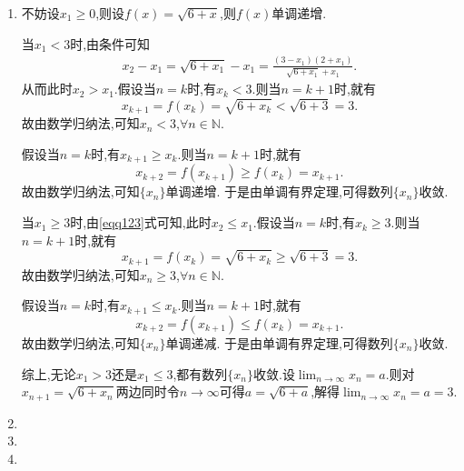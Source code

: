 \documentclass[../../main.tex]{subfiles}%
\begin{document}
\begin{solution}
\begin{enumerate}
\item 不妨设$x_1\geqslant  0$,则设\(f(x)=\sqrt{6 + x}\),则\(f(x)\)单调递增.

当\(x_1 < 3\)时,由条件可知
\begin{gather}\label{eqq123}
x_2 - x_1=\sqrt{6 + x_1}-x_1=\frac{(3 - x_1)(2 + x_1)}{\sqrt{6 + x_1}+x_1}.
\end{gather}
从而此时\(x_2 > x_1\).假设当\(n = k\)时,有\(x_k < 3\).则当\(n = k + 1\)时,就有
\[
x_{k + 1}=f(x_k)=\sqrt{6 + x_k}<\sqrt{6 + 3}=3.
\]
故由数学归纳法,可知\(x_n < 3\),\(\forall n\in\mathbb{N}\).

假设当\(n = k\)时,有\(x_{k + 1}\geqslant x_k\).则当\(n = k + 1\)时,就有
\[
x_{k + 2}=f(x_{k + 1})\geqslant f(x_k)=x_{k + 1}.
\]
故由数学归纳法,可知\(\{x_n\}\)单调递增.
于是由单调有界定理,可得数列\(\{x_n\}\)收敛.

当\(x_1\geqslant 3\)时,由\eqref{eqq123}式可知,此时\(x_2\leqslant x_1\).假设当\(n = k\)时,有\(x_k\geqslant 3\).则当\(n = k + 1\)时,就有
\[
x_{k + 1}=f(x_k)=\sqrt{6 + x_k}\geqslant\sqrt{6 + 3}=3.
\]
故由数学归纳法,可知\(x_n\geqslant 3\),\(\forall n\in\mathbb{N}\).

假设当\(n = k\)时,有\(x_{k + 1}\leqslant x_k\).则当\(n = k + 1\)时,就有
\[
x_{k + 2}=f(x_{k + 1})\leqslant f(x_k)=x_{k + 1}.
\]
故由数学归纳法,可知\(\{x_n\}\)单调递减.
于是由单调有界定理,可得数列\(\{x_n\}\)收敛.

综上,无论\(x_1 > 3\)还是\(x_1\leqslant 3\),都有数列\(\{x_n\}\)收敛.设\(\lim_{n\rightarrow\infty}x_n = a\).则对\(x_{n + 1}=\sqrt{6 + x_n}\)两边同时令\(n\rightarrow\infty\)可得\(a=\sqrt{6 + a}\),解得\(\lim_{n\rightarrow\infty}x_n = a = 3\).

\item 

\item 

\item 
\end{enumerate}

\end{solution}
\end{document}
